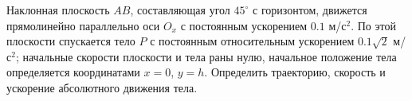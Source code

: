 Наклонная плоскость $AB$, составляющая угол $45^{\circ}$ с горизонтом,
движется прямолинейно параллельно оси $O_x$
с постоянным ускорением $0.1$ м/с$^2$.
По этой плоскости спускается тело $P$ с постоянным относительным ускорением
$0.1\sqrt{2}$ м/с$^2$; начальные скорости плоскости и тела раны нулю,
начальное положение тела определяется координатами $x = 0$, $y = h$.
Определить траекторию, скорость и ускорение абсолютного движения тела.

